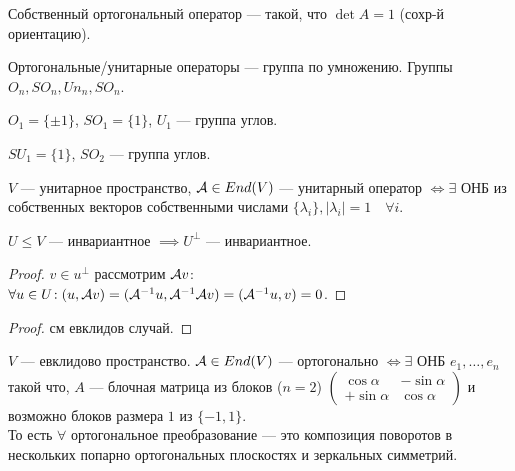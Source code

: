 \begin{definition}
Собственный ортогональный оператор — такой, что $\det A = 1$ (сохр-й ориентацию).
\end{definition}
\begin{remark}
    Ортогональные/унитарные операторы --- группа по умножению. Группы $O_n, SO_n, Un_n, SO_n$.
\end{remark}
\begin{example}
    $O_1 = \{\pm 1\}$, $SO_1 = \{1\}$, $U_1$ --- группа углов.
    
    $SU_1 = \{1\}$,  $SO_2$ --- группа углов.
\end{example}

\begin{theorem}
    $V$ --- унитарное пространство,  $\mathcal{A} \in End(V)$ --- унитарный оператор  $\iff \exists$ ОНБ из собственных векторов  собственными числами  $\{\lambda_i\}, |\lambda_i| = 1 \quad \forall i$.
\end{theorem}
\begin{lemma}
    $U \le V$ --- инвариантное $\implies U^{\perp}$ --- инвариантное.
\end{lemma}
\begin{proof}
    $v \in u^\perp$ рассмотрим  $\mathcal{A} v$:  $\forall u \in U\!: (u, \mathcal{A} v) = (\mathcal{A}^{-1}u, \mathcal{A}^{-1}\mathcal{A} v) = (\mathcal{A}^{-1}u, v) = 0$.
\end{proof}
\begin{proof}
    см евклидов случай.
\end{proof}
\begin{theorem}
    $V$ --- евклидово пространство.  $\mathcal{A} \in End(V)$ --- ортогонально  $\iff \exists$ ОНБ $e_1, \ldots, e_n$ такой что, $A$ --- блочная матрица из блоков ($n=2$)
    $\left(
        \begin{matrix}
            \cos \alpha & -\sin \alpha\\
            +\sin \alpha & \cos \alpha
        \end{matrix} \right)$
и возможно блоков размера $1$ из $\{-1, 1\}$.\\
То есть $\forall$ ортогональное преобразование — это композиция поворотов в нескольких попарно ортогональных плоскостях и зеркальных симметрий.
\end{theorem}
